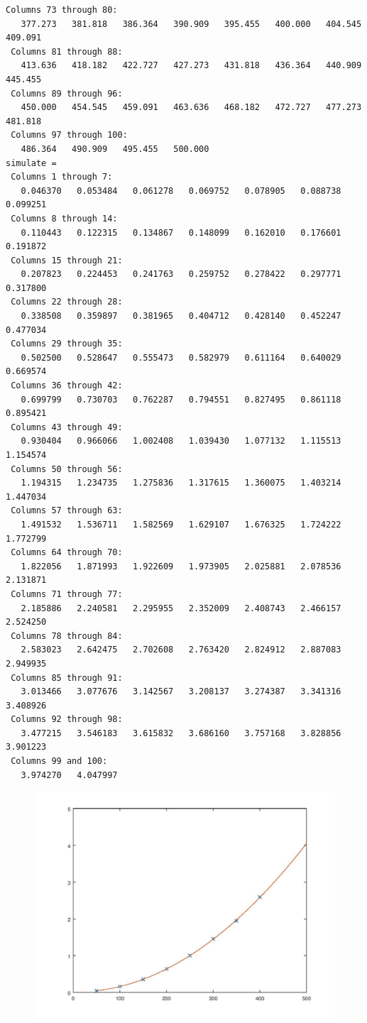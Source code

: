 \documentclass[10pt]{article}
\begin{document}
\begin{lstlisting}[language={},xleftmargin=5pt,frame=none]
 Columns 73 through 80:
   377.273   381.818   386.364   390.909   395.455   400.000   404.545   409.091
 Columns 81 through 88:
   413.636   418.182   422.727   427.273   431.818   436.364   440.909   445.455
 Columns 89 through 96:
   450.000   454.545   459.091   463.636   468.182   472.727   477.273   481.818
 Columns 97 through 100:
   486.364   490.909   495.455   500.000
simulate =
 Columns 1 through 7:
   0.046370   0.053484   0.061278   0.069752   0.078905   0.088738   0.099251
 Columns 8 through 14:
   0.110443   0.122315   0.134867   0.148099   0.162010   0.176601   0.191872
 Columns 15 through 21:
   0.207823   0.224453   0.241763   0.259752   0.278422   0.297771   0.317800
 Columns 22 through 28:
   0.338508   0.359897   0.381965   0.404712   0.428140   0.452247   0.477034
 Columns 29 through 35:
   0.502500   0.528647   0.555473   0.582979   0.611164   0.640029   0.669574
 Columns 36 through 42:
   0.699799   0.730703   0.762287   0.794551   0.827495   0.861118   0.895421
 Columns 43 through 49:
   0.930404   0.966066   1.002408   1.039430   1.077132   1.115513   1.154574
 Columns 50 through 56:
   1.194315   1.234735   1.275836   1.317615   1.360075   1.403214   1.447034
 Columns 57 through 63:
   1.491532   1.536711   1.582569   1.629107   1.676325   1.724222   1.772799
 Columns 64 through 70:
   1.822056   1.871993   1.922609   1.973905   2.025881   2.078536   2.131871
 Columns 71 through 77:
   2.185886   2.240581   2.295955   2.352009   2.408743   2.466157   2.524250
 Columns 78 through 84:
   2.583023   2.642475   2.702608   2.763420   2.824912   2.887083   2.949935
 Columns 85 through 91:
   3.013466   3.077676   3.142567   3.208137   3.274387   3.341316   3.408926
 Columns 92 through 98:
   3.477215   3.546183   3.615832   3.686160   3.757168   3.828856   3.901223
 Columns 99 and 100:
   3.974270   4.047997

\end{lstlisting}
\begin{figure}[!ht]
\includegraphics[width=\textwidth]{test-1.jpg}
\end{figure}
\end{document}
